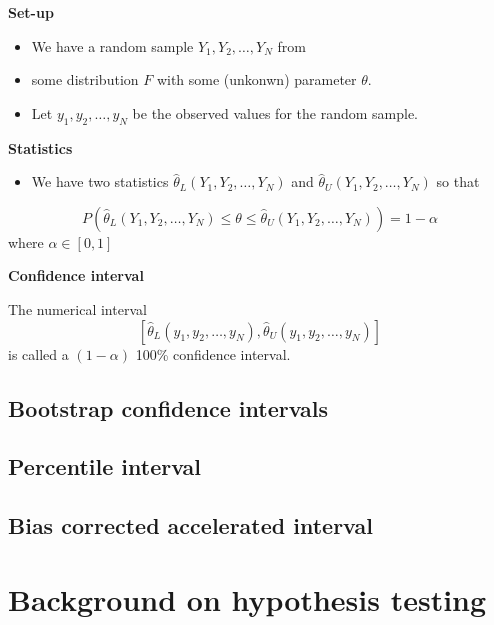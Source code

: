\documentclass[
  letterpaper,
  DIV=11,
  numbers=noendperiod]{scrartcl}
\providecommand{\tightlist}{%
  \setlength{\itemsep}{0pt}\setlength{\parskip}{0pt}}\usepackage{longtable,booktabs,array}
\begin{document}
\textbf{Set-up}

\begin{itemize}
\tightlist
\item
  We have a random sample \(Y_1,Y_2,\ldots,Y_N\) from
\item
  some distribution \(F\) with some (unkonwn) parameter \(\theta\).
\item
  Let \(y_1,y_2,\ldots,y_N\) be the observed values for the random
  sample.
\end{itemize}

\textbf{Statistics}

\begin{itemize}
\tightlist
\item
  We have two statistics \(\hat{\theta}_L(Y_1,Y_2,\ldots,Y_N)\) and
  \(\hat{\theta}_U(Y_1,Y_2,\ldots,Y_N)\) so that
\end{itemize}

\[P(\hat{\theta}_L(Y_1,Y_2,\ldots,Y_N)\le \theta \le \hat{\theta}_U(Y_1,Y_2,\ldots,Y_N))=1-\alpha\]
where \(\alpha\in [0,1]\)

\textbf{Confidence interval}

The numerical interval
\[[\hat{\theta}_L(y_1,y_2,\ldots,y_N),\hat{\theta}_U(y_1,y_2,\ldots,y_N)]\]
is called a \((1-\alpha)\) 100\% confidence interval.

\hypertarget{bootstrap-confidence-intervals}{%
\subsection{Bootstrap confidence
intervals}\label{bootstrap-confidence-intervals}}

\hypertarget{percentile-interval}{%
\subsection{Percentile interval}\label{percentile-interval}}

\hypertarget{bias-corrected-accelerated-interval}{%
\subsection{Bias corrected accelerated
interval}\label{bias-corrected-accelerated-interval}}

\hypertarget{background-on-hypothesis-testing}{%
\section{Background on hypothesis
testing}\label{background-on-hypothesis-testing}}
\end{document}
